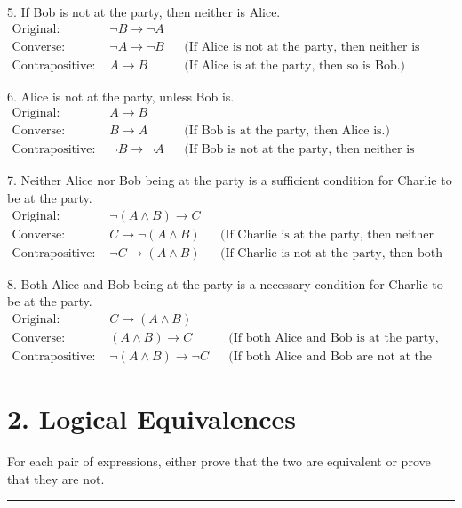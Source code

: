\documentclass[]{article}
\begin{document}
5. If Bob is not at the party, then neither is Alice.
\begin{align*}
    \text{Original: } & \neg B \rightarrow \neg A \\
    \text{Converse: } & \neg A \rightarrow \neg B
        && \text{(If Alice is not at the party, then neither is Bob.)} \\
    \text{Contrapositive: } & A \rightarrow B
        && \text{(If Alice is at the party, then so is Bob.)}
\end{align*}

6. Alice is not at the party, unless Bob is.
\begin{align*}
    \text{Original: } & A \rightarrow B \\
    \text{Converse: } & B \rightarrow A
        && \text{(If Bob is at the party, then Alice is.)} \\
    \text{Contrapositive: } & \neg B \rightarrow \neg A
        && \text{(If Bob is not at the party, then neither is Alice.)}
\end{align*}

7. Neither Alice nor Bob being at the party is a sufficient condition for Charlie to be at the party.
\begin{align*}
    \text{Original: } & \neg(A \land B) \rightarrow C \\
    \text{Converse: } & C \rightarrow \neg(A \land B)
        && \text{(If Charlie is at the party, then neither Alice nor Bob is.)} \\
    \text{Contrapositive: } & \neg C \rightarrow (A \land B)
        && \text{(If Charlie is not at the party, then both Alice and Bob are.)}
\end{align*}

8. Both Alice and Bob being at the party is a necessary condition for Charlie to be at the party.
\begin{align*}
    \text{Original: } & C \rightarrow (A \land B) \\
    \text{Converse: } & (A \land B) \rightarrow C
        && \text{(If both Alice and Bob is at the party, then so is Charlie.)} \\
    \text{Contrapositive: } & \neg(A \land B) \rightarrow \neg C
        && \text{(If both Alice and Bob are not at the party, then neither is Charlie.)}
\end{align*}

\section*{2. Logical Equivalences}
For each pair of expressions, either prove that the two are equivalent or prove that they are not.
\hrule
\vspace{0.1in}
\end{document}
